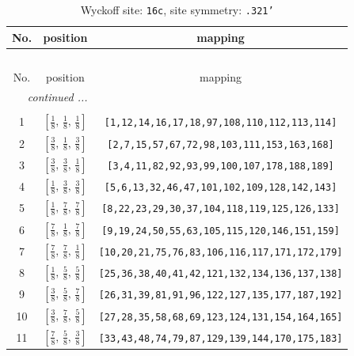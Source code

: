 \documentclass[fleqn,8pt]{jsarticle}
\begin{document}
\begin{longtable}{ccc}
\caption{Wyckoff site: {\tt 16c}, site symmetry: {\tt .321'}}
 \\
 \hline \hline
No. & position & mapping \\ \hline \endfirsthead

\multicolumn{2}{l}{\tablename\ \thetable{}} \\
 \hline \hline
No. & position & mapping \\ \hline \endhead

 \hline \hline
\multicolumn{2}{r}{\footnotesize\it continued ...} \\ \endfoot

 \hline \hline
\multicolumn{2}{r}{} \\ \endlastfoot

1 & $\left[ \frac{1}{8},\, \frac{1}{8},\, \frac{1}{8} \right]$ & {\tt [1,12,14,16,17,18,97,108,110,112,113,114]} \\ \hline
2 & $\left[ \frac{3}{8},\, \frac{1}{8},\, \frac{3}{8} \right]$ & {\tt [2,7,15,57,67,72,98,103,111,153,163,168]} \\ \hline
3 & $\left[ \frac{3}{8},\, \frac{3}{8},\, \frac{1}{8} \right]$ & {\tt [3,4,11,82,92,93,99,100,107,178,188,189]} \\ \hline
4 & $\left[ \frac{1}{8},\, \frac{3}{8},\, \frac{3}{8} \right]$ & {\tt [5,6,13,32,46,47,101,102,109,128,142,143]} \\ \hline
5 & $\left[ \frac{1}{8},\, \frac{7}{8},\, \frac{7}{8} \right]$ & {\tt [8,22,23,29,30,37,104,118,119,125,126,133]} \\ \hline
6 & $\left[ \frac{7}{8},\, \frac{1}{8},\, \frac{7}{8} \right]$ & {\tt [9,19,24,50,55,63,105,115,120,146,151,159]} \\ \hline
7 & $\left[ \frac{7}{8},\, \frac{7}{8},\, \frac{1}{8} \right]$ & {\tt [10,20,21,75,76,83,106,116,117,171,172,179]} \\ \hline
8 & $\left[ \frac{1}{8},\, \frac{5}{8},\, \frac{5}{8} \right]$ & {\tt [25,36,38,40,41,42,121,132,134,136,137,138]} \\ \hline
9 & $\left[ \frac{3}{8},\, \frac{5}{8},\, \frac{7}{8} \right]$ & {\tt [26,31,39,81,91,96,122,127,135,177,187,192]} \\ \hline
10 & $\left[ \frac{3}{8},\, \frac{7}{8},\, \frac{5}{8} \right]$ & {\tt [27,28,35,58,68,69,123,124,131,154,164,165]} \\ \hline
11 & $\left[ \frac{7}{8},\, \frac{5}{8},\, \frac{3}{8} \right]$ & {\tt [33,43,48,74,79,87,129,139,144,170,175,183]} \\ \hline

\end{longtable}
\end{document}
